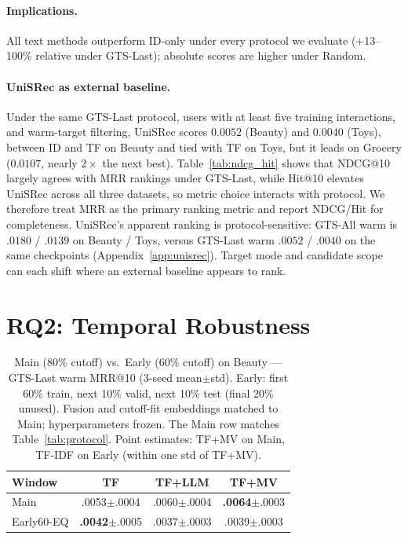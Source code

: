 \documentclass[sigconf,natbib=true,anonymous]{acmart}
\newcommand{\tfidf}{\textsc{TF-IDF}\xspace}
\newcommand{\tfmv}{\textsc{TF+MV}\xspace}
\begin{document}
\paragraph{Implications.}
All text methods outperform ID-only under every protocol we evaluate ($+$13--100\% relative under GTS-Last); absolute scores are higher under Random.

\paragraph{UniSRec as external baseline.}
Under the same GTS-Last protocol, users with at least five training interactions, and warm-target filtering, UniSRec scores $0.0052$ (Beauty) and $0.0040$ (Toys), between ID and TF on Beauty and tied with TF on Toys, but it leads on Grocery ($0.0107$, nearly $2\times$ the next best).
Table~\ref{tab:ndcg_hit} shows that NDCG@10 largely agrees with MRR rankings under GTS-Last, while Hit@10 elevates UniSRec across all three datasets, so metric choice interacts with protocol.
We therefore treat MRR as the primary ranking metric and report NDCG/Hit for completeness.
UniSRec's apparent ranking is protocol-sensitive: GTS-All warm is $.0180$ / $.0139$ on Beauty / Toys, versus GTS-Last warm $.0052$ / $.0040$ on the same checkpoints (Appendix~\ref{app:unisrec}).
Target mode and candidate scope can each shift where an external baseline appears to rank.

\section{RQ2: Temporal Robustness}
\label{sec:rq2}

\begin{table}[t]
\centering
\caption{%
Main ($80\%$ cutoff) vs.\ Early ($60\%$ cutoff) on Beauty --- GTS-Last warm MRR@10 (3-seed mean$\pm$std).
Early: first 60\% train, next 10\% valid, next 10\% test (final 20\% unused).
Fusion and cutoff-fit embeddings matched to Main; hyperparameters frozen.
The Main row matches Table~\ref{tab:protocol}.
Point estimates: \tfmv{} on Main, \tfidf{} on Early (within one std of \tfmv).%
}
\label{tab:early}
\small
\begin{tabular}{@{}lccc@{}}
\toprule
Window & TF & TF+LLM & TF+MV \\
\midrule
Main      & .0053\tiny{$\pm$.0004} & .0060\tiny{$\pm$.0004} & \textbf{.0064}\tiny{$\pm$.0003} \\
Early60-EQ & \textbf{.0042}\tiny{$\pm$.0005} & .0037\tiny{$\pm$.0003} & .0039\tiny{$\pm$.0003} \\
\bottomrule
\end{tabular}
\end{table}
\end{document}
